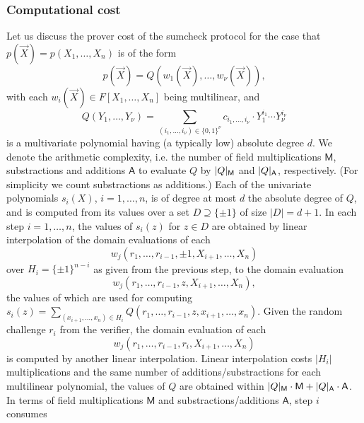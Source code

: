 \documentclass[11pt]{article}
\theoremstyle{definition}
\theoremstyle{definition}
\newtheorem{rem}[thm]{Remark}
\begin{document}
\subsubsection{Computational cost}

Let us discuss the prover cost of the sumcheck protocol for the case that  $p(\vec X) = p(X_1,\ldots, X_n)$ is of the form
\[
p(\vec X) = Q(w_1(\vec X), \ldots, w_\nu(\vec X)),
\]
with each $w_i(\vec X)\in F[X_1,\ldots, X_n]$ being multilinear, and 
\[
Q(Y_1,\ldots, Y_\nu) = \sum_{(i_1,\ldots, i_\nu)\in \{0,1\}^\nu} c_{i_1,\ldots, i_\nu} \cdot Y_1^{i_1}\cdots Y_\nu^{i_\nu}
\]
 is a multivariate polynomial having (a typically low) absolute degree $d$.
We denote the arithmetic complexity, i.e. the number of field multiplications $\mathsf M$, substractions and additions $\mathsf A$ to evaluate $Q$ by $|Q|_\textsf M$ and $|Q|_\textsf A$, respectively.
(For simplicity we count substractions as additions.) 
Each of the univariate polynomials $s_i(X)$, $i=1,\ldots, n$, is of degree at most $d$ the absolute degree of $Q$, and is computed from its values over a set $D\supseteq \{\pm 1\}$ of  size $|D| = d + 1$.
In each step $i=1,\ldots, n$, the values of $s_i(z)$ for $z\in D$ are obtained by linear interpolation of the domain evaluations of each
\[
w_j (r_1,\ldots, r_{i-1}, \pm 1, X_{i+1}, \ldots, X_n)
\]
over $H_{i}=\{\pm 1\}^{n-i}$ as given from the previous step, to the domain evaluation
\[
w_j (r_1,\ldots, r_{i-1}, z, X_{i+1}, \ldots, X_n), 
\]
the values of which are used for computing $s_i(z) = \sum_{(x_{i+1},\ldots, x_n)\in H_{i}} Q(r_1,\ldots, r_{i-1}, z, x_{i+1}, \ldots, x_n)$.
Given the random challenge $r_i$ from the verifier, the domain evaluation of each   
\[
w_j(r_1,\ldots, r_{i-1}, r_i, X_{i+1},\ldots, X_n)
\]
is computed by another linear interpolation.
Linear interpolation costs $|H_i|$ multiplications and the same number of additions/substractions for each multilinear polynomial, the values of $Q$ are obtained within $|Q|_\textsf M \cdot \textsf{M} + |Q|_\textsf A \cdot \textsf A$.  
In terms of field multiplications $\mathsf M$ and substractions/additions $\mathsf A$, step $i$ consumes 
\end{document}
